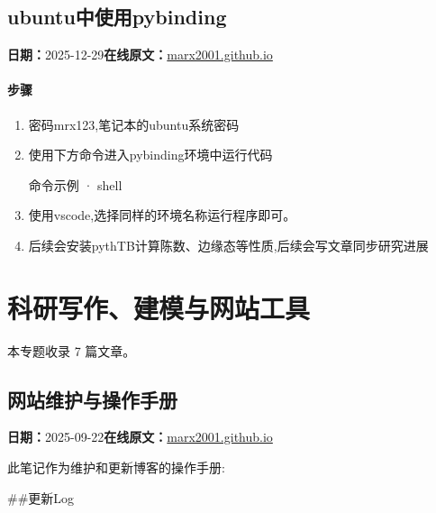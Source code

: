 \documentclass[lang=cn,scheme=chinese,color=blue,device=normal,toc=onecol,math=cm]{elegantbook}
\begin{document}
\section{ubuntu中使用pybinding}
\begin{articlemeta}
\textbf{日期：}2025-12-29\hfill\textbf{在线原文：}\href{https://marx2001.github.io/sci-note\_posts/20251229mrx-usage}{marx2001.github.io}
\end{articlemeta}

\subsubsection{步骤}


\begin{enumerate}
\item 密码mrx123,笔记本的ubuntu系统密码
\item 使用下方命令进入pybinding环境中运行代码 
\begin{inlinecodebox}{命令示例 · shell}
\end{inlinecodebox}
\item 使用vscode,选择同样的环境名称运行程序即可。
\item 后续会安装pythTB计算陈数、边缘态等性质,后续会写文章同步研究进展
\end{enumerate}


\chapter{科研写作、建模与网站工具}
\begin{partbox}本专题收录 7 篇文章。\end{partbox}

\section{网站维护与操作手册}
\begin{articlemeta}
\textbf{日期：}2025-09-22\hfill\textbf{在线原文：}\href{https://marx2001.github.io/sci-note\_posts/20250922-note/}{marx2001.github.io}
\end{articlemeta}

此笔记作为维护和更新博客的操作手册:\par


\#\#更新Log\par
\end{document}
